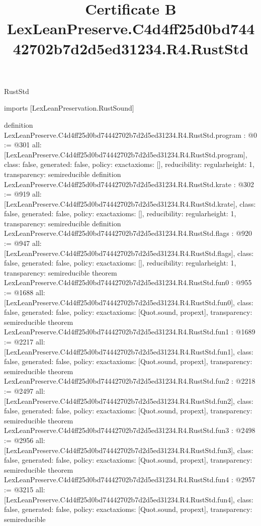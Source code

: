 \begin{lexlean}{RustStd}
\title{Certificate B LexLeanPreserve.C4d4ff25d0bd74442702b7d2d5ed31234.R4.RustStd}
\begin{coremodule}
imports [LexLeanPreservation.RustSound]

definition LexLeanPreserve.C4d4ff25d0bd74442702b7d2d5ed31234.R4.RustStd.program : @0 := @301 {
  all: [LexLeanPreserve.C4d4ff25d0bd74442702b7d2d5ed31234.R4.RustStd.program],
  class: false,
  generated: false,
  policy: exact{axioms: []},
  reducibility: regular{height: 1},
  transparency: semireducible
}
definition LexLeanPreserve.C4d4ff25d0bd74442702b7d2d5ed31234.R4.RustStd.krate : @302 := @919 {
  all: [LexLeanPreserve.C4d4ff25d0bd74442702b7d2d5ed31234.R4.RustStd.krate],
  class: false,
  generated: false,
  policy: exact{axioms: []},
  reducibility: regular{height: 1},
  transparency: semireducible
}
definition LexLeanPreserve.C4d4ff25d0bd74442702b7d2d5ed31234.R4.RustStd.flags : @920 := @947 {
  all: [LexLeanPreserve.C4d4ff25d0bd74442702b7d2d5ed31234.R4.RustStd.flags],
  class: false,
  generated: false,
  policy: exact{axioms: []},
  reducibility: regular{height: 1},
  transparency: semireducible
}
theorem LexLeanPreserve.C4d4ff25d0bd74442702b7d2d5ed31234.R4.RustStd.fun0 : @955 := @1688 {
  all: [LexLeanPreserve.C4d4ff25d0bd74442702b7d2d5ed31234.R4.RustStd.fun0],
  class: false,
  generated: false,
  policy: exact{axioms: [Quot.sound, propext]},
  transparency: semireducible
}
theorem LexLeanPreserve.C4d4ff25d0bd74442702b7d2d5ed31234.R4.RustStd.fun1 : @1689 := @2217 {
  all: [LexLeanPreserve.C4d4ff25d0bd74442702b7d2d5ed31234.R4.RustStd.fun1],
  class: false,
  generated: false,
  policy: exact{axioms: [Quot.sound, propext]},
  transparency: semireducible
}
theorem LexLeanPreserve.C4d4ff25d0bd74442702b7d2d5ed31234.R4.RustStd.fun2 : @2218 := @2497 {
  all: [LexLeanPreserve.C4d4ff25d0bd74442702b7d2d5ed31234.R4.RustStd.fun2],
  class: false,
  generated: false,
  policy: exact{axioms: [Quot.sound, propext]},
  transparency: semireducible
}
theorem LexLeanPreserve.C4d4ff25d0bd74442702b7d2d5ed31234.R4.RustStd.fun3 : @2498 := @2956 {
  all: [LexLeanPreserve.C4d4ff25d0bd74442702b7d2d5ed31234.R4.RustStd.fun3],
  class: false,
  generated: false,
  policy: exact{axioms: [Quot.sound, propext]},
  transparency: semireducible
}
theorem LexLeanPreserve.C4d4ff25d0bd74442702b7d2d5ed31234.R4.RustStd.fun4 : @2957 := @3215 {
  all: [LexLeanPreserve.C4d4ff25d0bd74442702b7d2d5ed31234.R4.RustStd.fun4],
  class: false,
  generated: false,
  policy: exact{axioms: [Quot.sound, propext]},
  transparency: semireducible
}
\end{coremodule}
\end{lexlean}
